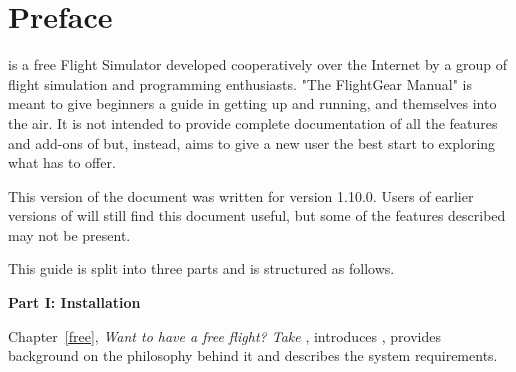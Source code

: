 
\chapter*{Preface\label{preface}}

\FlightGear{} is a free Flight Simulator developed cooperatively over the Internet 
by a group of flight simulation and programming enthusiasts. "The
FlightGear Manual" is meant to give beginners a guide in getting
\FlightGear{} up and running, and themselves into the air. It is not
intended to provide complete documentation of all the features and
add-ons of \FlightGear{} but, instead, aims to give a new user the best
start to exploring what \FlightGear{} has to offer.

This version of the document was written for \FlightGear{} version 1.10.0. 
Users of earlier versions of \FlightGear{} will still find this document
useful, but some of the features described may not be present.

This guide is split into three parts and is structured as follows.

\medskip

\noindent
\textbf{Part I: Installation}
\medskip

 \noindent
Chapter~\ref{free}, \textit{Want to have a free flight? Take \FlightGear{}}, introduces
\FlightGear{}, provides background on the philosophy behind it and describes the system requirements.
 \medskip

